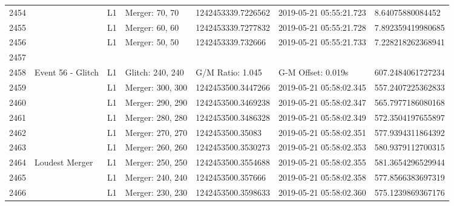 \begin{longtable}{lllllll}
2454 &                                                    &       L1 &    Merger: 70, 70 &  1242453339.7226562 &  2019-05-21 05:55:21.723 &    8.64075880084452 \\
2455 &                                                    &       L1 &    Merger: 60, 60 &  1242453339.7277832 &  2019-05-21 05:55:21.728 &   7.892359419980685 \\
2456 &                                                    &       L1 &    Merger: 50, 50 &   1242453339.732666 &  2019-05-21 05:55:21.733 &   7.228218262368941 \\
2457 &                                                    &          &                   &                     &                          &                     \\
2458 &                                  Event 56 - Glitch &       L1 &  Glitch: 240, 240 &    G/M Ratio: 1.045 &       G-M Offset: 0.019s &   607.2484061727234 \\
2459 &                                                    &       L1 &  Merger: 300, 300 &  1242453500.3447266 &  2019-05-21 05:58:02.345 &   557.2407225362833 \\
2460 &                                                    &       L1 &  Merger: 290, 290 &  1242453500.3469238 &  2019-05-21 05:58:02.347 &   565.7977186080168 \\
2461 &                                                    &       L1 &  Merger: 280, 280 &  1242453500.3486328 &  2019-05-21 05:58:02.349 &   572.3504197655897 \\
2462 &                                                    &       L1 &  Merger: 270, 270 &    1242453500.35083 &  2019-05-21 05:58:02.351 &   577.9394311864392 \\
2463 &                                                    &       L1 &  Merger: 260, 260 &  1242453500.3530273 &  2019-05-21 05:58:02.353 &   580.9379112700315 \\
2464 &                                     Loudest Merger &       L1 &  Merger: 250, 250 &  1242453500.3554688 &  2019-05-21 05:58:02.355 &   581.3654296529944 \\
2465 &                                                    &       L1 &  Merger: 240, 240 &   1242453500.357666 &  2019-05-21 05:58:02.358 &   577.8566383697319 \\
2466 &                                                    &       L1 &  Merger: 230, 230 &  1242453500.3598633 &  2019-05-21 05:58:02.360 &   575.1239869367176 \\

\end{longtable}
